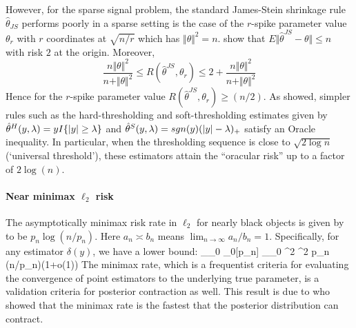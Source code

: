 \documentclass[11pt]{article}
\begin{document}
However, for the sparse signal problem, the standard James-Stein shrinkage rule $ \hat{\theta}_{JS} $ performs poorly in a sparse setting is the case of the $r$-spike parameter value $ \theta_r$ with $r$ coordinates at $ \sqrt{n/r} $ which has $ \Vert \theta \Vert^2 =n $. \citet{johnstone2004needles} show that $ E \Vert \hat{\theta}^{JS} - \theta \Vert \leq n $ with risk $2$ at the origin. Moreover, 
\[
\frac{n \Vert \theta \Vert^2}{ n + \Vert \theta \Vert^2} \leq R \left ( \hat{\theta}^{JS} , \theta_r \right ) \leq
2 + \frac{n \Vert \theta \Vert^2}{ n + \Vert \theta \Vert^2}
\]
Hence for the $r$-spike parameter value $ R \left( \hat{\theta}^{JS} , \theta_r \right) \geq (n/2)$. As \citet{donoho1994ideal} showed, simpler rules such as the hard-thresholding and soft-thresholding estimates given by $\hat{\theta}^{H}(y,\lambda) = y I\{\lvert y\rvert \ge \lambda \}$ and $\hat{\theta}^{S}(y,\lambda) = sgn(y) (\lvert y\rvert - \lambda)_{+}$ satisfy an Oracle inequality. In particular, when the thresholding sequence is close to $\sqrt{2\log n}$ (`universal threshold'), these estimators attain the ``oracular risk'' up to a factor of $2\log(n)$. 

\paragraph{Near minimax $\ell_2$ risk}

The asymptotically minimax risk rate in $\ell_2$ for nearly black objects is given by \citet{donoho1992maximum} to be $p_n \log \left ( n / p_n \right )$. Here $a_n \asymp b_n$ means $\lim_{n\to\infty} a_n/b_n=1$. Specifically, for any estimator $\delta(y)$, we have a lower bound: 
\beq
\sup_{\theta_0 \in \ell_0[p_n]} \E_{\theta_0} ^2  \sigma^2 p_n \log(n/p_n)(1+o(1))
\eeq
The minimax rate, which is a frequentist criteria for evaluating the convergence of point estimators to the underlying true parameter, is a validation criteria for posterior contraction as well. This result is due to \citet{ghosal2000} who showed that the minimax rate is the fastest that the posterior distribution can contract. 
\end{document}
